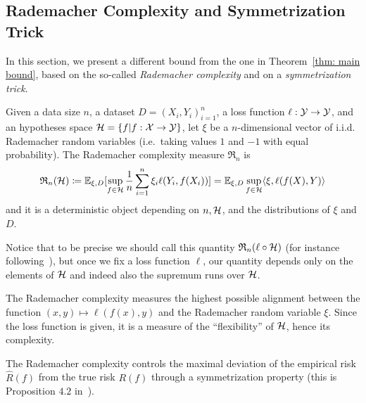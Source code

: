 \documentclass[reqno]{amsart}
\begin{document}
\subsection{Rademacher Complexity and Symmetrization Trick}

In this section, we present a different bound from the one in Theorem~\ref{thm: main bound}, based on the so-called {\it\/Rademacher complexity} and on a {\it\/symmetrization trick}.

\begin{definition}\label{def: rademacher}
    Given a data size $n$, a dataset $D = {(X_i, Y_i)}_{i=1}^n$, a loss function $\ell:\mathcal{Y}\to\mathcal{Y}$, and an hypotheses space $\mathcal{H}=\{f \vert f:\mathcal{X}\to\mathcal{Y}\}$, let $\xi$ be a $n$-dimensional vector of i.i.d. Rademacher random variables (i.e.\ taking values $1$ and $-1$ with equal probability). The Rademacher complexity measure $\mathfrak R_n$ is
    \begin{equation}
        \mathfrak R_n(\mathcal{H}) \coloneq \mathbb{E}_{\xi,D} [\sup_{f\in\mathcal{H}} \frac{1}{n}\sum_{i=1}^n \xi_i\ell(Y_i, f(X_i))] = \mathbb{E}_{\xi,D} \sup_{f\in\mathcal{H}} \langle \xi, \ell(f(X),Y)\rangle
    \end{equation}
    and it is a deterministic object depending on $n, \mathcal{H}$, and the distributions of $\xi$ and $D$. 
\end{definition}

Notice that to be precise we should call this quantity $\mathfrak{R}_n(\ell\circ\mathcal{H})$ (for instance following~\cite{boucheron2005theory}), but once we fix a loss function $\ell$, our quantity depends only on the elements of $\mathcal{H}$ and indeed also the supremum runs over $\mathcal{H}$. 


\begin{remark}
    The Rademacher complexity measures the highest possible alignment between the function $(x,y)\mapsto \ell(f(x),y)$ and the Rademacher random variable $\xi$. Since the loss function is given, it is a measure of the ``flexibility'' of $\mathcal{H}$, hence its complexity.
\end{remark}

The Rademacher complexity controls the maximal deviation of the empirical risk $\hat R(f)$ from the true risk $R(f)$ through a symmetrization property (this is Proposition $4.2$ in~\cite{bach2024learning}). 
\end{document}
